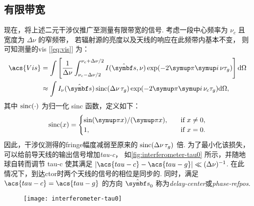 \subsection{有限带宽}

现在，将上述二元干涉仪推广至测量有限带宽的信号.
考虑一段中心频率为 $\nu_c$ 且宽度为 $\Delta\nu$ 的窄频带，
若辐射源的亮度以及天线的响应在此频带内基本不变，
则可知测量的\ac{vis} [\autoref{eq:vis}] 为：
\begin{align}
  \acs{Vis} &= \int \left[ \frac{1}{\Delta\nu}
        \int_{\nu_c-\Delta\nu/2}^{\nu_c+\Delta\nu/2}
        I(\hat{\B{s}}, \nu) \exp (-2\Cpi\Ci\, \nu\tau_g)
      \right] \D{\Omega} \\
    &\approx \int I_{\nu}(\hat{\B{s}}) \sinc (\Delta\nu\,\tau_g)
      \exp (-2\Cpi\Ci\, \nu_c\tau_g) \D{\Omega},
  \label{eq:vis-bw}
\end{align}
其中 $\operatorname{sinc}(\cdot)$ 为归一化 sinc 函数，定义如下：
\begin{equation}
  \label{eq:sinc}
  \sinc(x) =
    \begin{cases}
      \sin(\Cpi x) / (\Cpi x), & \quad \text{if } x \neq 0, \\
      1, & \quad \text{if } x = 0.
    \end{cases}
\end{equation}
因此，干涉仪测得的\ac{fringe}幅度减弱至原来的 $\operatorname{sinc}(\Delta\nu\,\tau_g)$ 倍.
为了最小化该损失，可以给前导天线的输出信号增加\emph{\acf{tau-c}}，
如\autoref{fig:interferometer-tau0} 所示，并随地球自转而调节 \acs{tau-c}
使其满足 $|\acs{tau-c} - \acs{tau-g}| \ll (\Delta\nu)^{-1}$.
在此情况下，到达\ac{ctor}时两个天线的信号的相位是同步的.
同时，满足 $\acs{tau-c} = \acs{tau-g}$ 的方向 $\hat{\B{s}}_0$
称为\emph{\acf{delay-center}}或\emph{\acf{phase-refpos}}.

\begin{figure}[htp]
  \centering
  \texttt{[image: interferometer-tau0]}
  \label{fig:interferometer-tau0}
\end{figure}

